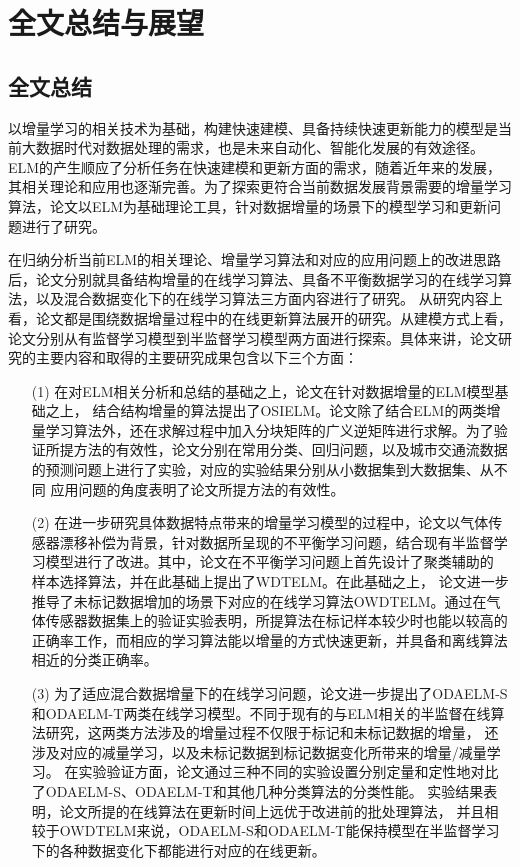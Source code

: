 \documentclass{standalone}
\begin{document}
	
\chapter{全文总结与展望}

\section{全文总结}

以增量学习的相关技术为基础，构建快速建模、具备持续快速更新能力的模型是当前大数据时代对数据处理的需求，也是未来自动化、智能化发展的有效途径。ELM的产生顺应了分析任务在快速建模和更新方面的需求，随着近年来的发展，其相关理论和应用也逐渐完善。为了探索更符合当前数据发展背景需要的增量学习算法，论文以ELM为基础理论工具，针对数据增量的场景下的模型学习和更新问题进行了研究。

在归纳分析当前ELM的相关理论、增量学习算法和对应的应用问题上的改进思路后，论文分别就具备结构增量的在线学习算法、具备不平衡数据学习的在线学习算法，以及混合数据变化下的在线学习算法三方面内容进行了研究。
从研究内容上看，论文都是围绕数据增量过程中的在线更新算法展开的研究。从建模方式上看，论文分别从有监督学习模型到半监督学习模型两方面进行探索。具体来讲，论文研究的主要内容和取得的主要研究成果包含以下三个方面：
\begin{enumerate}[labelsep = .5em, leftmargin = 0pt, itemindent = 3.8em]
\item[(1)]在对ELM相关分析和总结的基础之上，论文在针对数据增量的ELM模型基础之上，
结合结构增量的算法提出了OSIELM。论文除了结合ELM的两类增量学习算法外，还在求解过程中加入分块矩阵的广义逆矩阵进行求解。为了验证所提方法的有效性，论文分别在常用分类、回归问题，以及城市交通流数据的预测问题上进行了实验，对应的实验结果分别从小数据集到大数据集、从不同
应用问题的角度表明了论文所提方法的有效性。
\item[(2)]在进一步研究具体数据特点带来的增量学习模型的过程中，论文以气体传感器漂移补偿为背景，针对数据所呈现的不平衡学习问题，结合现有半监督学习模型进行了改进。其中，论文在不平衡学习问题上首先设计了聚类辅助的
样本选择算法，并在此基础上提出了WDTELM。在此基础之上，
论文进一步推导了未标记数据增加的场景下对应的在线学习算法OWDTELM。通过在气体传感器数据集上的验证实验表明，所提算法在标记样本较少时也能以较高的正确率工作，而相应的学习算法能以增量的方式快速更新，并具备和离线算法相近的分类正确率。
\item[(3)]为了适应混合数据增量下的在线学习问题，论文进一步提出了ODAELM-S和ODAELM-T两类在线学习模型。不同于现有的与ELM相关的半监督在线算法研究，这两类方法涉及的增量过程不仅限于标记和未标记数据的增量，
还涉及对应的减量学习，以及未标记数据到标记数据变化所带来的增量/减量学习。
在实验验证方面，论文通过三种不同的实验设置分别定量和定性地对比了ODAELM-S、ODAELM-T和其他几种分类算法的分类性能。
实验结果表明，论文所提的在线算法在更新时间上远优于改进前的批处理算法，
并且相较于OWDTELM来说，ODAELM-S和ODAELM-T能保持模型在半监督学习下的各种数据变化下都能进行对应的在线更新。
\end{enumerate}
\end{document}
